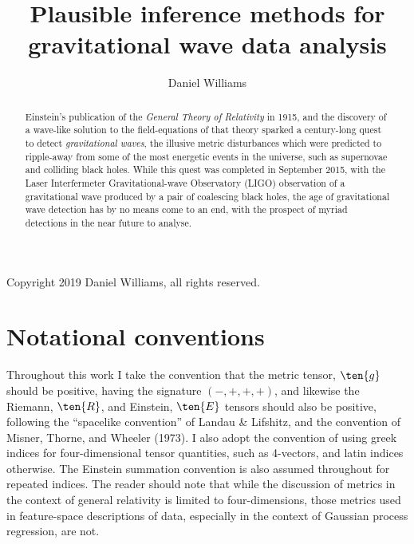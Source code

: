 \documentclass{kentigern}
\title{Plausible inference methods for gravitational wave data analysis}
\author{Daniel Williams}
\theoremstyle{definition}
\begin{document}
\openleft
\frontmatter
\thesistitle

\begin{abstract}
  Einstein's publication of the \textit{General Theory of Relativity} in 1915, and the discovery of a wave-like solution to the field-equations of that theory sparked a century-long quest to detect \textit{gravitational waves},
  the illusive metric disturbances which were predicted to ripple-away from some of the most energetic events in the universe, such as supernovae and colliding black holes.
  While this quest was completed in September 2015, with the Laser Interfermeter Gravitational-wave Observatory (LIGO) observation of a gravitational wave produced by a pair of coalescing black holes,
  the age of gravitational wave detection has by no means come to an end,
  with the prospect of myriad detections in the near future to analyse.
\end{abstract}
\newpage

Copyright 2019 Daniel Williams, all rights reserved.

\newpage
\tableofcontents
\newpage
\listoffigures
\newpage
\listoftables

\newpage


\section{Notational conventions}
\label{sec:notation-conventions}

Throughout this work I take the convention that the metric tensor, $\ten{g}$ should be positive, having the signature $(-,+,+,+)$, and likewise the Riemann, $\ten{R}$, and Einstein, $\ten{E}$ tensors should also be positive, following the ``spacelike convention'' of Landau \& Lifshitz, and the convention of Misner, Thorne, and Wheeler (1973). I also adopt the convention of using greek indices for four-dimensional tensor quantities, such as 4-vectors, and latin indices otherwise. The Einstein summation convention is also assumed throughout for repeated indices. The reader should note that while the discussion of metrics in the context of general relativity is limited to four-dimensions, those metrics used in feature-space descriptions of data, especially in the context of Gaussian process regression, are not. 
\end{document}
